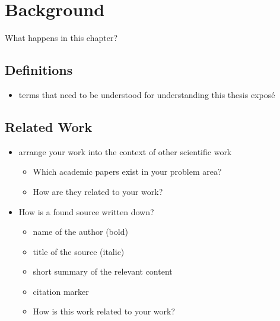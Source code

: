 \chapter{Background}

What happens in this chapter?

\section{Definitions}

\begin{itemize}
\item terms that need to be understood for understanding this thesis exposé
\end{itemize}

\section{Related Work}

\begin{itemize}
\item arrange your work into the context of other scientific work
\begin{itemize}
  \item Which academic papers exist in your problem area?
  \item How are they related to your work?
\end{itemize}
\item How is a found source written down?
\begin{itemize}
\item name of the author (bold)
\item title of the source (italic)
\item short summary of the relevant content
\item citation marker
\item How is this work related to your work?
\end{itemize}
\end{itemize}